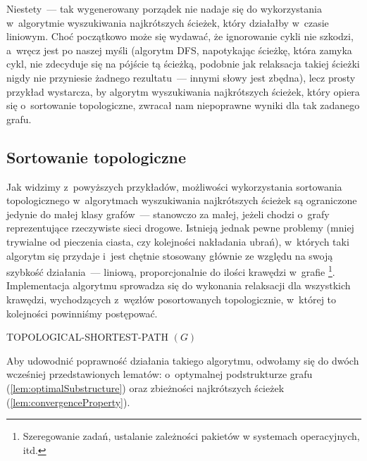 Niestety~---  tak wygenerowany porządek nie nadaje się do wykorzystania w~algorytmie wyszukiwania najkrótszych ścieżek, który działałby w~czasie liniowym. Choć początkowo może się wydawać, że ignorowanie cykli nie szkodzi, a~wręcz jest po naszej myśli (algorytm \textsf{DFS}, napotykając ścieżkę, która zamyka cykl, nie zdecyduje się na pójście tą ścieżką, podobnie jak relaksacja takiej ścieżki nigdy nie przyniesie żadnego rezultatu~--- innymi słowy jest zbędna), lecz prosty przykład wystarcza, by algorytm wyszukiwania najkrótszych ścieżek, który opiera się o~sortowanie topologiczne, zwracał nam niepoprawne wyniki dla tak zadanego grafu.

\subsection{Sortowanie topologiczne}

Jak widzimy z~powyższych przykładów, możliwości wykorzystania sortowania topologicznego w~algorytmach wyszukiwania najkrótszych ścieżek są ograniczone jedynie do małej klasy grafów~--- stanowczo za małej, jeżeli chodzi o~grafy reprezentujące rzeczywiste sieci drogowe. Istnieją jednak pewne problemy (mniej trywialne od pieczenia ciasta, czy kolejności nakładania ubrań), w~których taki algorytm się przydaje i~jest chętnie stosowany głównie ze względu na swoją szybkość działania~--- liniową, proporcjonalnie do ilości krawędzi w~grafie \footnote{Szeregowanie zadań, ustalanie zależności pakietów w systemach operacyjnych, itd.}. Implementacja algorytmu sprowadza się do wykonania relaksacji dla wszystkich krawędzi, wychodzących z~węzłów posortowanych topologicznie, w~której to kolejności powinniśmy postępować.

\begin{algorithm}[!htbp]
\DontPrintSemicolon
{}
\caption{ TOPOLOGICAL-SHORTEST-PATH $\left( G \right)$\label{alg:topologicalShorestPath}}
\end{algorithm}

Aby udowodnić poprawność działania takiego algorytmu, odwołamy się do dwóch wcześniej przedstawionych lematów: o~optymalnej podstrukturze grafu (\ref{lem:optimalSubstructure}) oraz zbieżności najkrótszych ścieżek (\ref{lem:convergenceProperty}).

